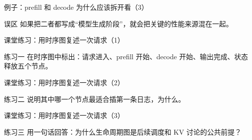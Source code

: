 \begin{frame}{例子：prefill 和 decode 为什么应该拆开看（3）}
\begin{block}{误区}
    如果把二者都写成“模型生成阶段”，就会把关键的性能来源混在一起。
  \end{block}
\end{frame}

\begin{frame}{课堂练习：用时序图复述一次请求（1）}
\begin{block}{练习一}
    在时序图中标出：请求进入、prefill 开始、decode 开始、输出完成、状态释放五个节点。
  \end{block}
\end{frame}

\begin{frame}{课堂练习：用时序图复述一次请求（2）}
\begin{block}{练习二}
    说明其中哪一个节点最适合插第一条日志，为什么。
  \end{block}
\end{frame}

\begin{frame}{课堂练习：用时序图复述一次请求（3）}
\begin{block}{练习三}
    用一句话回答：为什么生命周期图是后续调度和 KV 讨论的公共前提？
  \end{block}
\end{frame}
